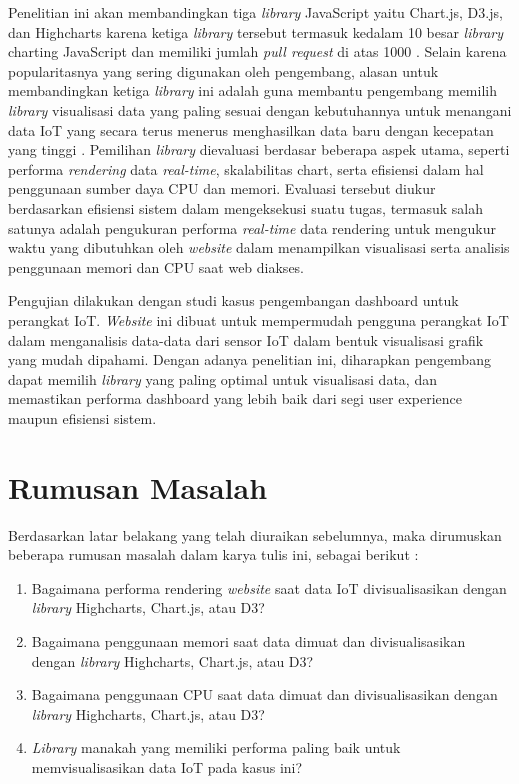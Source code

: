 Penelitian ini  akan membandingkan tiga \textit{library} JavaScript yaitu Chart.js, D3.js, dan Highcharts karena ketiga \textit{library} tersebut termasuk kedalam 10 besar \textit{library} charting JavaScript dan memiliki jumlah \textit{pull request} di atas 1000 \cite{ossinsight}. Selain karena popularitasnya yang sering digunakan oleh pengembang, alasan untuk membandingkan ketiga \textit{library} ini adalah guna membantu pengembang memilih \textit{library} visualisasi data yang paling sesuai dengan kebutuhannya untuk menangani data IoT yang secara terus menerus menghasilkan data baru dengan kecepatan yang tinggi \cite{Khairy2023}. Pemilihan \textit{library} dievaluasi berdasar beberapa aspek utama, seperti performa \textit{rendering} data \textit{real-time}, skalabilitas chart, serta efisiensi dalam hal penggunaan sumber daya CPU dan memori. Evaluasi tersebut diukur berdasarkan efisiensi sistem dalam mengeksekusi suatu tugas, termasuk salah satunya adalah pengukuran performa \textit{real-time} data rendering untuk mengukur waktu yang dibutuhkan oleh \textit{website} dalam menampilkan visualisasi \cite{Persson2021} serta analisis penggunaan memori dan CPU saat web diakses.

Pengujian dilakukan dengan studi kasus pengembangan dashboard untuk perangkat IoT. \textit{Website} ini dibuat untuk mempermudah pengguna perangkat IoT dalam menganalisis data-data dari sensor IoT dalam bentuk visualisasi grafik yang mudah dipahami. Dengan adanya penelitian ini, diharapkan pengembang dapat memilih \textit{library} yang paling optimal untuk visualisasi data, dan memastikan performa dashboard yang lebih baik dari segi user experience maupun efisiensi sistem.

\section{Rumusan Masalah}
Berdasarkan latar belakang yang telah diuraikan sebelumnya, maka dirumuskan beberapa rumusan masalah dalam karya tulis ini, sebagai berikut :
\begin{enumerate}
    \item Bagaimana performa rendering \textit{website} saat data IoT divisualisasikan dengan \textit{library} Highcharts, Chart.js, atau D3? 
    \item Bagaimana penggunaan memori saat data dimuat dan divisualisasikan dengan \textit{library} Highcharts, Chart.js, atau D3? 
    \item Bagaimana penggunaan CPU saat data dimuat dan divisualisasikan dengan \textit{library} Highcharts, Chart.js, atau D3? 
    \item \textit{Library} manakah yang memiliki performa paling baik untuk memvisualisasikan data IoT pada kasus ini? 
\end{enumerate}


